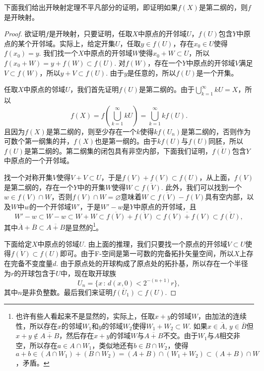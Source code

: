 下面我们给出开映射定理不平凡部分的证明，即证明如果$f(X)$是第二纲的，则$f$是开映射。

\begin{proof}
欲证明$f$是开映射，只要证明，任取$X$中原点的开邻域$U$，$f(U)$包含$Y$中原点的某个开邻域。实际上，给定开集$U$，任取$y\in f(U)$，存在$x_0\in U$使得$f(x_0)=y$. 我们找一个$X$中原点的开邻域$W$使得$x_0+W\subset U$，所以$f(x_0+W)=y+f(W)\subset f(U)$. 对$f(W)$，存在一个$Y$中原点的开邻域$V$满足$V\subset f(W)$，所以$y+V\subset f(U)$. 由于$y$是任意的，所以$f(U)$是一个开集。

任取$X$中原点的邻域$U$，我们首先证明$f(U)$是第二纲的。由于$\bigcup_{k=1}^\infty kU=X$，所以
\[
	f(X)=f\left(\bigcup_{k=1}^\infty kU\right)=\bigcup_{k=1}^\infty kf(U).
\]
且因为$f(X)$是第二纲的，则至少存在一个$k$使得$kf(U_n)$是第二纲的，否则作为可数个第一纲集的并，$f(X)$也是第一纲的。由于$kf(U)$与$f(U)$同胚，所以$f(U)$是第二纲的。第二纲集的闭包具有非空内部，下面我们证明，$\overline{f(U)}$包含$Y$中原点的一个开邻域。

找一个对称开集$V$使得$V+V\subset U$，于是$f(V)+f(V)\subset f(U)$，从上面，$f(V)$是第二纲的，存在一个$Y$中的开集$W$使得$W\subset \overline{f(V)}$. 此外，我们可以找到一个$w\in f(V)\cap W$，否则$f(V)\cap W=\varnothing$意味着$W\subset \overline{f(V)}-f(V)$具有空内部，以及$W$中$w$的一个开邻域$W'$，于是$W'-w$是$Y$中原点的开邻域，且
\[
	W'-w\subset W-w\subset W+W\subset \overline{f(V)}+\overline{f(V)}\subset \overline{f(V)+f(V)}\subset \overline{f(U)},
\]
其中$\overline{A}+\overline{B}\subset \overline{A+B}$是显然的\footnote{也许有些人看起来不是显然的，实际上，任取$x+y$的邻域$W$，由加法的连续性，所以存在$x$的邻域$W_1$和$y$的邻域$W_2$使得$W_1+W_2\subset W$. 如果$x\in \overline{A}$, $y\in \overline{B}$但$x+y\not\in \overline{A+B}$，然后存在$x+y$的邻域$W$与$\overline{A+B}$不交。由于$W_1$与$A$相交非空，所以存在$a\in A\cap W_1$，类似地还有$b\in B\cap W_2$，使得$a+b\in (A\cap W_1)+(B\cap W_2)=(A+B)\cap(W_1+W_2)\subset (A+B)\cap W$，矛盾。}。

下面给定$X$中原点的邻域$U$. 由上面的推理，我们只要找一个原点的开邻域$V\subset U$使得$\overline{f(V)}\subset f(U)$即可。由于F-空间是第一可数的完备拓扑矢量空间，所以$X$上存在完备不变度量$d$. 由于原点处的开球构成了原点处的拓扑基，所以存在一个半径为$r$的开球包含于$U$中，现在取开球族
\[
	U_n=\{x\,:\,d(x,0)<2^{-(n+1)}r\},
\]
其中$n$是非负整数。最后我们来证明$\overline{f(U_1)}\subset f(U)$.


\end{proof}
